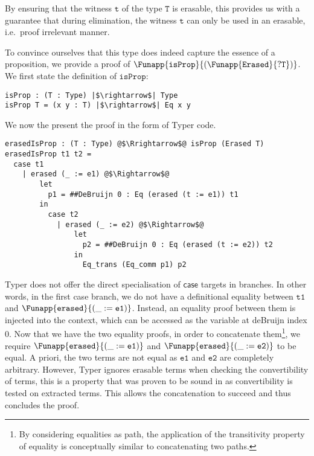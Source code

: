 \documentclass[12pt,twoside,maitrise]{dms}
\theoremstyle{definition}
\numberwithin{equation}{section}
\numberwithin{table}{chapter}
\numberwithin{figure}{chapter}
\newcommand\kw[1] {\textsf{#1}}
\newcommand\id[1] {\texttt{#1}}
\begin{document}
By ensuring that the witness $\id{t}$ of the type $\id{T}$ is erasable, this
provides us with a guarantee that during elimination, the witness $\id{t}$ can
only be used in an erasable, i.e.\ proof irrelevant manner.

To convince ourselves that this type does indeed capture the essence of a
proposition, we provide a proof of
$\Funapp{\id{isProp}}{(\Funapp{\id{Erased}}{?\id{T}})}$. We first state the
definition of $\id{isProp}$:

\begin{verbatim}
isProp : (T : Type) |$\rightarrow$| Type
isProp T = (x y : T) |$\rightarrow$| Eq x y
\end{verbatim}

We now the present the proof in the form of Typer code.

\begin{verbatim}
erasedIsProp : (T : Type) @$\Rrightarrow$@ isProp (Erased T)
erasedIsProp t1 t2 =
  case t1
    | erased (_ := e1) @$\Rightarrow$@
        let
          p1 = ##DeBruijn 0 : Eq (erased (t := e1)) t1
        in
          case t2
            | erased (_ := e2) @$\Rightarrow$@
                let
                  p2 = ##DeBruijn 0 : Eq (erased (t := e2)) t2
                in
                  Eq_trans (Eq_comm p1) p2
\end{verbatim}

Typer does not offer the direct specialisation of $\kw{case}$ targets in
branches. In other words, in the first case branch, we do not have a
definitional equality between $\id{t1}$ and
$\Funapp{\id{erased}}{(\earg{\_}{\id{e1}})}$. Instead, an equality proof between
them is injected into the context, which can be accessed as the variable at
deBruijn index 0. Now that we have the two equality proofs, in order to
concatenate them\footnote{By considering equalities as path, the application of
the transitivity property of equality is conceptually similar to concatenating
two paths.}, we require $\Funapp{\id{erased}}{(\earg{\_}{\id{e1}})}$ and
$\Funapp{\id{erased}}{(\earg{\_}{\id{e2}})}$ to be equal. A priori, the two
terms are not equal as $\id{e1}$ and $\id{e2}$ are completely arbitrary.
However, Typer ignores erasable terms when checking the convertibility of terms,
this is a property that was proven to be sound in\cite{barras2008implicit} as
convertibility is tested on extracted terms. This allows the concatenation to
succeed and thus concludes the proof.
\end{document}
